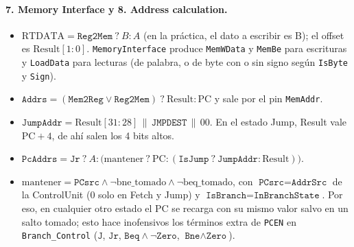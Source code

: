 \documentclass[11pt,a4paper]{article}
\newcommand{\sig}[1]{\texttt{#1}}
\begin{document}
\paragraph{7. Memory Interface y 8. Address calculation.}
\begin{itemize}
  \item $\mathrm{RTDATA}=\sig{Reg2Mem}\ ?\ B : A$ (en la pr\'actica, el dato a escribir es B); el offset es $\mathrm{Result}[1{:}0]$. \texttt{MemoryInterface} produce \sig{MemWData} y \sig{MemBe} para escrituras y \sig{LoadData} para lecturas (de palabra, o de byte con o sin signo seg\'un \sig{IsByte} y \sig{Sign}).
  \item $\sig{Addrs}=(\sig{Mem2Reg}\lor\sig{Reg2Mem})\ ?\ \mathrm{Result} : \mathrm{PC}$ y sale por el pin \sig{MemAddr}.
  \item $\sig{JumpAddr}=\mathrm{Result}[31{:}28]\,\|\,\sig{JMPDEST}\,\|\,00$. En el estado Jump, Result vale $\mathrm{PC}+4$, de ah\'i salen los 4 bits altos.
  \item $\sig{PcAddrs}=\sig{Jr}\ ?\ A : \bigl(\mathrm{mantener}\ ?\ \mathrm{PC} : (\sig{IsJump}\ ?\ \sig{JumpAddr} : \mathrm{Result})\bigr)$.
  \item $\mathrm{mantener}=\sig{PCsrc}\land\lnot\mathrm{bne\_tomado}\land\lnot\mathrm{beq\_tomado}$, con $\sig{PCsrc}=\sig{AddrSrc}$ de la ControlUnit ($0$ solo en Fetch y Jump) y $\sig{IsBranch}=\sig{InBranchState}$. Por eso, en cualquier otro estado el PC se recarga con su mismo valor salvo en un salto tomado; esto hace inofensivos los t\'erminos extra de \sig{PCEN} en \texttt{Branch\_Control} ($\sig{J}$, $\sig{Jr}$, $\sig{Beq}\land\lnot\sig{Zero}$, $\sig{Bne}\land\sig{Zero}$).
\end{itemize}
\end{document}
